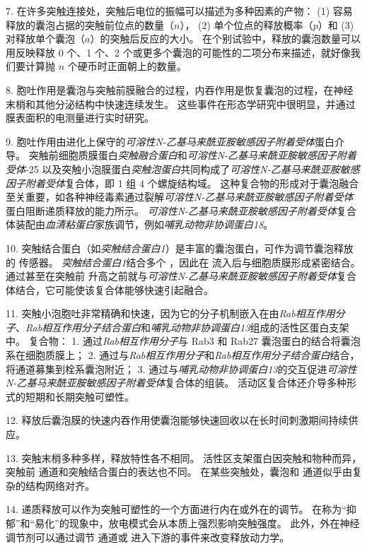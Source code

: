 7. 在许多突触连接处，突触后电位的振幅可以描述为多种因素的产物：
(1) 容易释放的囊泡占据的突触前位点的数量（$n$），
(2) 单个位点的释放概率（$p$）和
(3) 对释放单个囊泡（$a$）的突触后反应的大小。
在个别试验中，释放的囊泡数量可以用反映释放 0 个、1 个、2 个或更多个囊泡的可能性的二项分布来描述，就好像我们要计算抛 $n$ 个硬币时正面朝上的数量。


8. 胞吐作用是囊泡与突触前膜融合的过程，内吞作用是恢复囊泡的过程，在神经末梢和其他分泌结构中快速连续发生。
这些事件在形态学研究中很明显，并通过膜表面积的电测量进行实时研究。 


9. 胞吐作用由进化上保守的\textit{可溶性N-乙基马来酰亚胺敏感因子附着受体}蛋白介导。
突触前细胞质膜蛋白\textit{突触融合蛋白}和\textit{可溶性N-乙基马来酰亚胺敏感因子附着受体}-25 以及突触小泡膜蛋白\textit{突触泡蛋白}共同构成了\textit{可溶性N-乙基马来酰亚胺敏感因子附着受体}复合体，即 1 组 4 个螺旋结构域。
这种复合物的形成对于囊泡融合至关重要，如各种神经毒素通过裂解\textit{可溶性N-乙基马来酰亚胺敏感因子附着受体}蛋白阻断递质释放的能力所示。
\textit{可溶性N-乙基马来酰亚胺敏感因子附着受体}复合体装配由\textit{血清粘蛋白}家族调节，例如\textit{哺乳动物非协调蛋白18}。 


10. 突触结合蛋白（如\textit{突触结合蛋白1}）是丰富的囊泡蛋白，可作为调节囊泡释放的  传感器。
\textit{突触结合蛋白1}结合多个 ，因此在  流入后与细胞质膜形成紧密结合。
通过甚至在突触前  升高之前就与\textit{可溶性N-乙基马来酰亚胺敏感因子附着受体}复合体结合，它可能使该复合体能够快速引起融合。


11. 突触小泡胞吐非常精确和快速，因为它的分子机制嵌入在由\textit{Rab相互作用分子}、\textit{Rab相互作用分子结合蛋白}和\textit{哺乳动物非协调蛋白13}组成的活性区蛋白支架中。
复合物：
1. 通过\textit{Rab相互作用分子}与 Rab3 和 Rab27 囊泡蛋白的结合将囊泡系在细胞质膜上；
2. 通过与\textit{Rab相互作用分子}和\textit{Rab相互作用分子结合蛋白}结合，将通道募集到栓系囊泡附近；
3. 通过与\textit{哺乳动物非协调蛋白13}的交互促进\textit{可溶性N-乙基马来酰亚胺敏感因子附着受体}复合体的组装。
活动区复合体还介导多种形式的短期和长期突触可塑性。 


12. 释放后囊泡膜的快速内吞作用使囊泡能够快速回收以在长时间刺激期间持续供应。


13. 突触末梢多种多样，释放特性各不相同。
活性区支架蛋白因突触和物种而异，突触前  通道和突触结合蛋白的表达也不同。
在某些突触处，囊泡和  通道似乎由复杂的结构网络对齐。


14. 递质释放可以作为突触可塑性的一个方面进行内在或外在的调节。
在称为“抑郁”和“易化”的现象中，放电模式会从本质上强烈影响突触强度。
此外，外在神经调节剂可以通过调节  通道或  进入下游的事件来改变释放动力学。




